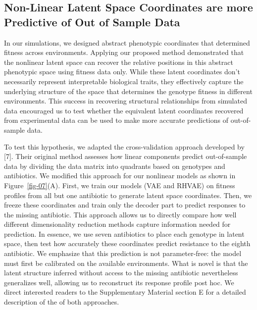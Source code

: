 \documentclass[
]{scrartcl}
\begin{document}
\begin{refsegment}
\begin{figure}
\end{figure}%

\subsection{Non-Linear Latent Space Coordinates are more Predictive of
Out of Sample
Data}\label{non-linear-latent-space-coordinates-are-more-predictive-of-out-of-sample-data}

In our simulations, we designed abstract phenotypic coordinates that
determined fitness across environments. Applying our proposed method
demonstrated that the nonlinear latent space can recover the relative
positions in this abstract phenotypic space using fitness data only.
While these latent coordinates don't necessarily represent interpretable
biological traits, they effectively capture the underlying structure of
the space that determines the genotype fitness in different
environments. This success in recovering structural relationships from
simulated data encouraged us to test whether the equivalent latent
coordinates recovered from experimental data can be used to make more
accurate predictions of out-of-sample data.

To test this hypothesis, we adapted the cross-validation approach
developed by {[}7{]}. Their original method assesses how linear
components predict out-of-sample data by dividing the data matrix into
quadrants based on genotypes and antibiotics. We modified this approach
for our nonlinear models as shown in Figure~\ref{fig-07}(A). First, we
train our models (VAE and RHVAE) on fitness profiles from all but one
antibiotic to generate latent space coordinates. Then, we freeze these
coordinates and train only the decoder part to predict responses to the
missing antibiotic. This approach allows us to directly compare how well
different dimensionality reduction methods capture information needed
for prediction. In essence, we use seven antibiotics to place each
genotype in latent space, then test how accurately these coordinates
predict resistance to the eighth antibiotic.
\textcolor{tempcolor}{ We emphasize
that this prediction is not parameter-free: the model must first be
calibrated on the available environments. What is novel is that the
latent structure inferred without access to the missing antibiotic
nevertheless generalizes well, allowing us to reconstruct its response
profile post hoc. We direct interested readers to the Supplementary
Material section E for a detailed description of the of both approaches.
}


\end{refsegment}
\end{document}
